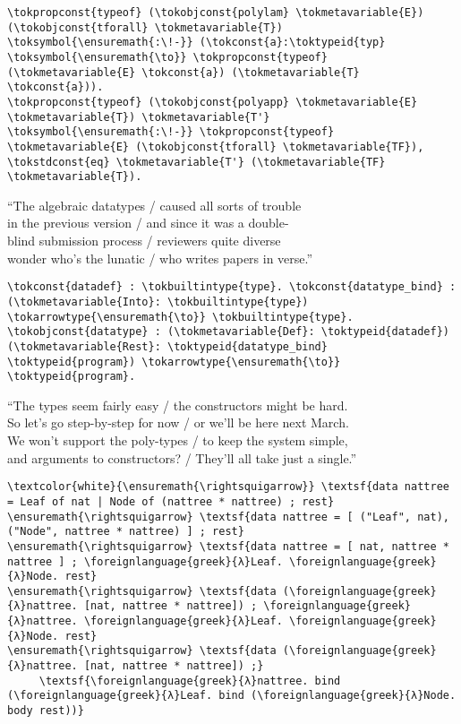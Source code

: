 \begin{verbatim}
\tokpropconst{typeof} (\tokobjconst{polylam} \tokmetavariable{E}) (\tokobjconst{tforall} \tokmetavariable{T}) \toksymbol{\ensuremath{:\!-}} (\tokconst{a}:\toktypeid{typ} \toksymbol{\ensuremath{\to}} \tokpropconst{typeof} (\tokmetavariable{E} \tokconst{a}) (\tokmetavariable{T} \tokconst{a})).
\tokpropconst{typeof} (\tokobjconst{polyapp} \tokmetavariable{E} \tokmetavariable{T}) \tokmetavariable{T'} \toksymbol{\ensuremath{:\!-}} \tokpropconst{typeof} \tokmetavariable{E} (\tokobjconst{tforall} \tokmetavariable{TF}), \tokstdconst{eq} \tokmetavariable{T'} (\tokmetavariable{TF} \tokmetavariable{T}).
\end{verbatim}

\importantCodeblockEnd{}

\begin{versy}
``The algebraic datatypes / caused all sorts of trouble \\
in the previous version / and since it was a double- \\
blind submission process / reviewers quite diverse \\
wonder who's the lunatic / who writes papers in verse.''
\end{versy}

\begin{verbatim}
\tokconst{datadef} : \tokbuiltintype{type}. \tokconst{datatype_bind} : (\tokmetavariable{Into}: \tokbuiltintype{type}) \tokarrowtype{\ensuremath{\to}} \tokbuiltintype{type}.
\tokobjconst{datatype} : (\tokmetavariable{Def}: \toktypeid{datadef}) (\tokmetavariable{Rest}: \toktypeid{datatype_bind} \toktypeid{program}) \tokarrowtype{\ensuremath{\to}} \toktypeid{program}.
\end{verbatim}

\begin{versy}
``The types seem fairly easy / the constructors might be hard. \\
So let's go step-by-step for now / or we'll be here next March. \\
We won't support the poly-types / to keep the system simple, \\
and arguments to constructors? / They'll all take just a single.''
\end{versy}

\begin{verbatim}
\textcolor{white}{\ensuremath{\rightsquigarrow}} \textsf{data nattree = Leaf of nat | Node of (nattree * nattree) ; rest}
\ensuremath{\rightsquigarrow} \textsf{data nattree = [ ("Leaf", nat), ("Node", nattree * nattree) ] ; rest}
\ensuremath{\rightsquigarrow} \textsf{data nattree = [ nat, nattree * nattree ] ; \foreignlanguage{greek}{λ}Leaf. \foreignlanguage{greek}{λ}Node. rest}
\ensuremath{\rightsquigarrow} \textsf{data (\foreignlanguage{greek}{λ}nattree. [nat, nattree * nattree]) ; \foreignlanguage{greek}{λ}nattree. \foreignlanguage{greek}{λ}Leaf. \foreignlanguage{greek}{λ}Node. rest}
\ensuremath{\rightsquigarrow} \textsf{data (\foreignlanguage{greek}{λ}nattree. [nat, nattree * nattree]) ;}
     \textsf{\foreignlanguage{greek}{λ}nattree. bind (\foreignlanguage{greek}{λ}Leaf. bind (\foreignlanguage{greek}{λ}Node. body rest))}
\end{verbatim}

